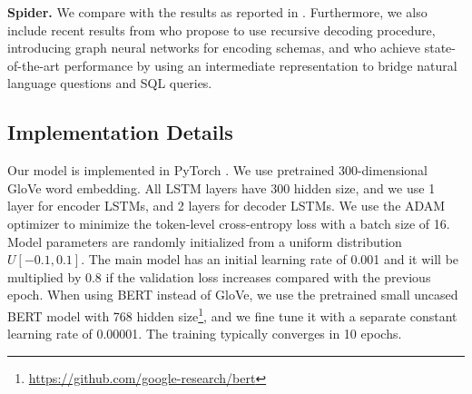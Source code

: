 \documentclass[11pt,a4paper]{article}
\begin{document}
\textbf{Spider.}
We compare with the results as reported in .
Furthermore, we also include recent results from  who propose to use recursive decoding procedure,  introducing graph neural networks for encoding schemas, and  who achieve state-of-the-art performance by using an intermediate representation to bridge natural language questions and SQL queries.

\subsection{Implementation Details}
Our model is implemented in PyTorch \cite{paszke2017automatic}.
We use pretrained 300-dimensional GloVe \cite{pennington2014glove} word embedding.
All LSTM layers have 300 hidden size, and we use 1 layer for encoder LSTMs, and 2 layers for decoder LSTMs.
We use the ADAM optimizer \cite{kingma2015adam} to minimize the token-level cross-entropy loss with a batch size of 16.
Model parameters are randomly initialized from a uniform distribution $U[-0.1,0.1]$.
The main model has an initial learning rate of 0.001 and it will be multiplied by 0.8 if the validation loss increases compared with the previous epoch.
When using BERT instead of GloVe, we use the pretrained small uncased BERT model with 768 hidden size\footnote{\scriptsize \url{https://github.com/google-research/bert}}, and we fine tune it with a separate constant learning rate of 0.00001.
The training typically converges in 10 epochs.

\begin{table}[t!]
\caption{Spider results on dev set and test set.
}
\vspace{-3mm}
\label{tab:spider_result}
\end{table}
\end{document}
